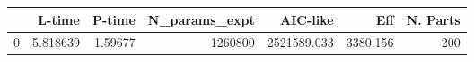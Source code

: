 \begin{tabular}{lrrrrrr}
\toprule
{} &    L-time &   P-time &  N\_params\_expt &     AIC-like &       Eff &  N. Parts \\
\midrule
0 &  5.818639 &  1.59677 &        1260800 &  2521589.033 &  3380.156 &       200 \\
\bottomrule
\end{tabular}
